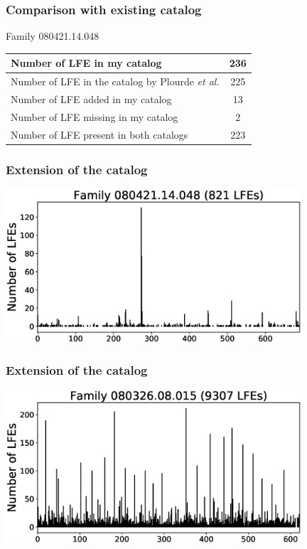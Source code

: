 \documentclass{beamer}
\begin{document}
	\begin{frame}
		\frametitle{Comparison with existing catalog}
		\begin{center}
		Family 080421.14.048

		\vspace{2em}

		\begin{tabular}{| l | c |}
			\hline
			Number of LFE in my catalog & 236 \\
			\hline
			Number of LFE in the catalog by Plourde \textit{et al.} & 225 \\
			\hline
			Number of LFE added in my catalog & 13 \\
			\hline
			Number of LFE missing in my catalog & 2 \\
			\hline
			Number of LFE present in both catalogs & 223 \\
			\hline
		\end{tabular}
		\end{center}
	\end{frame}

	\begin{frame}
		\frametitle{Extension of the catalog}
		\begin{center}
			\includegraphics[width=11cm, trim={0cm 0cm 0cm 0cm}, clip]{catalog_SC/08042114048_FAME.eps}
		\end{center}
	\end{frame}
	
	\begin{frame}
		\frametitle{Extension of the catalog}
		\begin{center}
			\includegraphics[width=11cm, trim={0cm 0cm 0cm 0cm}, clip]{catalog_SC/08032608015_FAME.eps}
		\end{center}
	\end{frame}
\end{document}
